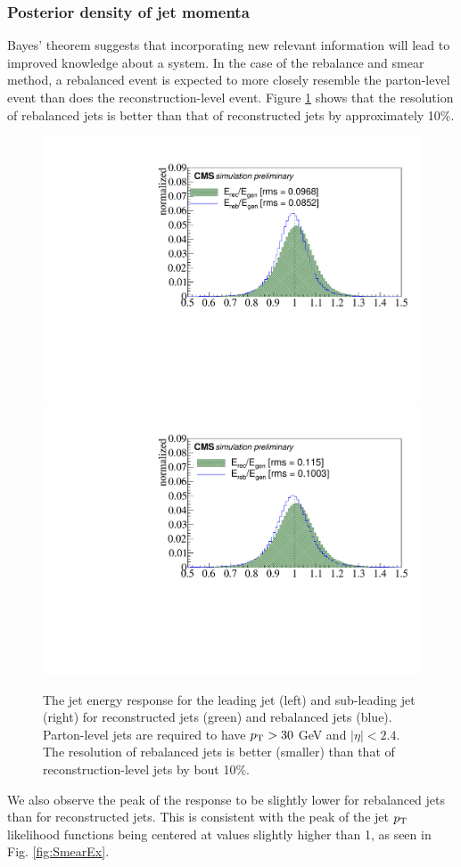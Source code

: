 \subsubsection{Posterior density of jet momenta}
Bayes' theorem suggests that incorporating new relevant information will lead to improved knowledge about a system. In the case of the rebalance and smear method, a rebalanced event is expected to more closely resemble the parton-level event than does the reconstruction-level event. Figure \ref{fig:rebareso} shows that the resolution of rebalanced jets is better than that of reconstructed jets by approximately 10\%.
\begin{figure}[h]
\centering
\includegraphics[width=0.49\linewidth]{figures/SusySearches/Ra2b2016/Jet1Resolution.pdf}
\includegraphics[width=0.49\linewidth]{figures/SusySearches/Ra2b2016/Jet2Resolution.pdf}
\caption{The jet energy response for the leading jet (left) and sub-leading jet (right) for reconstructed jets (green) and rebalanced jets (blue). Parton-level jets are required to have $p_{\text{T}}>30$ GeV and $|\eta|<2.4$. The resolution of rebalanced jets is better (smaller) than that of reconstruction-level jets by bout 10\%.}
\label{fig:rebareso}
\end{figure}
We also observe the peak of the response to be slightly lower for rebalanced jets than for reconstructed jets. This is consistent with the peak of the jet $p_{\text{T}}$ likelihood functions being centered at values slightly higher than 1, as seen in Fig. \ref{fig:SmearEx}. 

